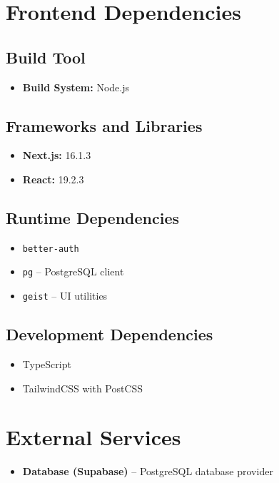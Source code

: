 \documentclass[a4paper,11pt]{article}
\begin{document}
\section{Frontend Dependencies}

\subsection{Build Tool}
\begin{itemize}
    \item \textbf{Build System:} Node.js
\end{itemize}

\subsection{Frameworks and Libraries}
\begin{itemize}
    \item \textbf{Next.js:} 16.1.3
    \item \textbf{React:} 19.2.3
\end{itemize}

\subsection{Runtime Dependencies}
\begin{itemize}
    \item \texttt{better-auth}
    \item \texttt{pg} – PostgreSQL client
    \item \texttt{geist} – UI utilities
\end{itemize}

\subsection{Development Dependencies}
\begin{itemize}
    \item TypeScript
    \item TailwindCSS with PostCSS
\end{itemize}

\section{External Services}

\begin{itemize}
    \item \textbf{Database (Supabase)} – PostgreSQL database provider
\end{itemize}
\end{document}

